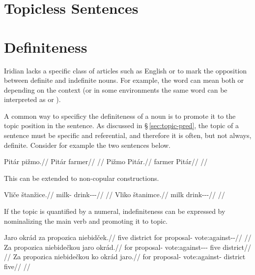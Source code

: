 \section{Topicless Sentences}\label{sec:topicless}

\section{Definiteness}\label{sec:definiteness}

Iridian lacks a specific class of articles such as English
 or  to mark the opposition between definite and indefinite
nouns. For example, the word  can mean both  or  depending on the context (or in some environments the same word can be
interpreted as   or ).

A common way to specificy the definiteness of a noun is to promote it to the
topic position in the sentence. As discussed in \S\,\ref{sec:topic-pred}, the
topic of a sentence must be specific and referential, and therefore it is often,
but not always, definite. Consider for example the two sentences below.

\begin{multicols}{2}
  \pex
  \a
  \begingl
  \gla Pitár pižmo.//
  \glb Pitár farmer//
  \glft {}//
  \endgl
  \a
  \begingl
  \gla Pižmo Pitár.//
  \glb farmer Pitár//
  \glft {}//
  \endgl
  \xe
\end{multicols}

This can be extended to non-copular constructions.

\begin{multicols}{2}
  \pex
  \a
  \begingl
  \gla Vliče štanžice.//
  \glb milk-\Gen{} drink-\Av{}-\Pf{}-\Quot{}//
  \glft {}//
  \endgl
  \a
  \begingl
  \gla Vliko štanimce.//
  \glb milk drink-\Pv{}-\Pf{}-\Quot{}//
  \glft {}//
  \endgl
  \xe
\end{multicols}

If the topic is quantified by a numeral, indefiniteness can be expressed by nominalizing the main verb and promoting it to topic.

\pex
\a
\begingl
\gla Jaro okrád za propozica niebidček.//
\glb five district for proposal-\Pat{} vote:against-\Av{}-\Pf{}//
\glft {}//
\endgl
\a
\begingl
\gla Za propozica niebidečkou jaro okrád.//
\glb for proposal-\Pat{} vote:against-\Av{}-\Pf{}-\Nz{} five district//
\glft {}//
\endgl
\a
\begingl
\gla Za propozica niebidečkou ko okrád jaro.//
\glb for proposal-\Pat{} vote:against-  district five//
\glft {}//
\endgl
\xe

